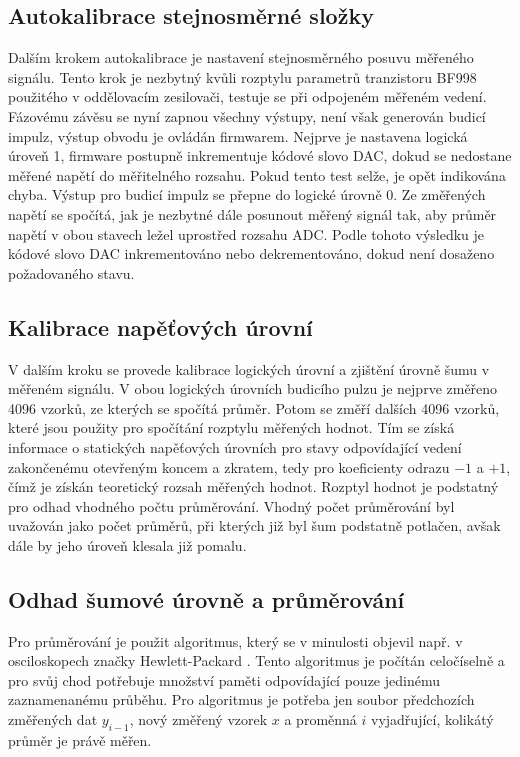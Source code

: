 \subsection{Autokalibrace stejnosměrné složky}
Dalším krokem autokalibrace je nastavení stejnosměrného posuvu měřeného signálu. Tento krok je nezbytný kvůli rozptylu parametrů tranzistoru BF998 použitého v oddělovacím zesilovači, testuje se při odpojeném měřeném vedení. Fázovému závěsu se nyní zapnou všechny výstupy, není však generován budicí impulz, výstup obvodu je ovládán firmwarem. Nejprve je nastavena logická úroveň 1, firmware postupně inkrementuje kódové slovo \acrshort{DAC}, dokud se nedostane měřené napětí do měřitelného rozsahu. Pokud tento test selže, je opět indikována chyba. Výstup pro budicí impulz se přepne do logické úrovně 0. Ze změřených napětí se spočítá, jak je nezbytné dále posunout měřený signál tak, aby průměr napětí v obou stavech ležel uprostřed rozsahu ADC. Podle tohoto výsledku je kódové slovo DAC inkrementováno nebo dekrementováno, dokud není dosaženo požadovaného stavu.

\subsection{Kalibrace napěťových úrovní}
V dalším kroku se provede kalibrace logických úrovní a zjištění úrovně šumu v měřeném signálu. V obou logických úrovních budicího pulzu je nejprve změřeno 4096 vzorků, ze kterých se spočítá průměr. Potom se změří dalších 4096 vzorků, které jsou použity pro spočítání rozptylu měřených hodnot. Tím se získá informace o statických napěťových úrovních pro stavy odpovídající vedení zakončenému otevřeným koncem a zkratem, tedy pro koeficienty odrazu $-1$ a $+1$, čímž je získán teoretický rozsah měřených hodnot. Rozptyl hodnot je podstatný pro odhad vhodného počtu průměrování. Vhodný počet průměrování byl uvažován jako počet průměrů, při kterých již byl šum podstatně potlačen, avšak dále by jeho úroveň klesala již pomalu.

\subsection{Odhad šumové úrovně a průměrování}
Pro průměrování je použit algoritmus, který se v minulosti objevil např. v osciloskopech značky Hewlett-Packard \cite{HP54100_article_journal}. Tento algoritmus je počítán celočíselně a pro svůj chod potřebuje množství paměti odpovídající pouze jedinému zaznamenanému průběhu. Pro algoritmus je potřeba jen soubor předchozích změřených dat $ y_{i-1}$, nový změřený vzorek $x$ a proměnná $i$ vyjadřující, kolikátý průměr je právě měřen.

